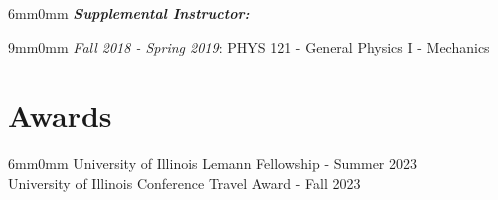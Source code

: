 \documentclass[letterpaper,11pt]{article}
\begin{document}
\begin{adjustwidth}{6mm}{0mm}
  \textbf{\textit{Supplemental Instructor:}}
\end{adjustwidth}

\begin{adjustwidth}{9mm}{0mm}
  \textit{Fall 2018 - Spring 2019}: PHYS 121 - General Physics I - Mechanics
\end{adjustwidth}

\section{Awards}

\begin{adjustwidth}{6mm}{0mm}
  University of Illinois Lemann Fellowship - Summer 2023
  \\
  University of Illinois Conference Travel Award - Fall 2023
\end{adjustwidth}
\end{document}
